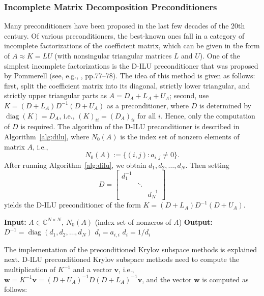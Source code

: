 \subsubsection{{Incomplete Matrix Decomposition Preconditioners}}\label{subsec:incomplete-decomposition-preconditioners}
{Many preconditioners have been proposed in the last few decades of the 20th century. Of various preconditioners, the best-known ones fall in a category of incomplete factorizations of the coefficient matrix, which can be given in the form of $A\approx K=LU$ (with nonsingular triangular matrices $L$ and $U$).}
{One of the simplest incomplete factorizations is the D-ILU preconditioner that was proposed by Pommerell (see, e.g., , pp.77--78). The idea of this method is given as follows: first, split the coefficient matrix into its diagonal, strictly lower triangular, and strictly upper triangular parts as $A=D_A+L_A+U_A$; second, use $K=(D+L_A)D^{-1}(D+U_A)$ as a preconditioner, where $D$ is determined by $\operatorname{diag}(K)=D_A$, i.e., $(K)_{ii}=(D_A)_{ii}$ for all $i$. Hence, only the computation of $D$ is required.}
{The algorithm of the D-ILU preconditioner is described in Algorithm\ \ref{alg:dilu}, where $N_0(A)$ is the index set of nonzero elements of matrix $A$, i.e.,}
\[N_0(A):=\{(i,j):a_{i,j}\ne0\}.\]
{After running Algorithm\ \ref{alg:dilu}, we obtain $d_1,d_2,\ldots,d_N$. Then setting}
\[D=\begin{bmatrix}d_1^{-1}&&\\&\ddots&\\&&d_N^{-1}\end{bmatrix}\]
{yields the D-ILU preconditioner of the form $K=(D+L_A)D^{-1}(D+U_A)$.}
\begin{algorithm}[H]\caption{{The D-ILU decomposition}}\label{alg:dilu}\begin{algorithmic}[1]
\Statex\textbf{Input:} $A\in\mathbb C^{N\times N},\ N_0(A)$ {(index set of nonzeros of $A$)}
\Statex\textbf{Output:} $D^{-1}=\operatorname{diag}(d_1,d_2,\ldots,d_N)$
\State $d_i=a_{i,i}$
\EndFor
{}
\State $d_i=1/d_i$
\EndFor\EndFor\end{algorithmic}\end{algorithm}
{The implementation of the preconditioned Krylov subspace methods is explained next. D-ILU preconditioned Krylov subspace methods need to compute the multiplication of $K^{-1}$ and a vector $\bm v$, i.e., $\bm w=K^{-1}\bm v=(D+U_A)^{-1}D(D+L_A)^{-1}\bm v$, and the vector $\bm w$ is computed as follows:}

